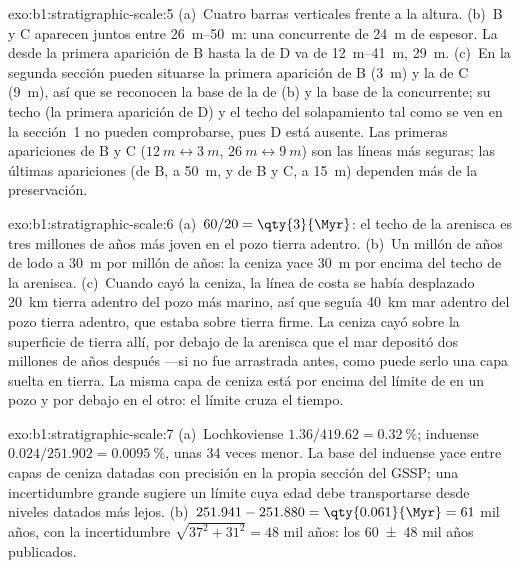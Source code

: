 \begin{solution}{exo:b1:stratigraphic-scale:5}
(a)~Cuatro barras verticales frente a la altura. (b)~B y C aparecen juntos entre \qtyrange{26}{50}{m}: una  concurrente de \qty{24}{m} de espesor. La 
desde la primera aparición de B hasta la de D va de \qtyrange{12}{41}{m}, \qty{29}{m}. (c)~En la segunda sección pueden situarse la primera aparición de B (\qty{3}{m}) y la de C (\qty{9}{m}), así que se reconocen la base de la  de (b) y
la base de la  concurrente; su techo (la primera aparición de D) y el techo del solapamiento tal como se ven en la sección~1 no pueden comprobarse, pues D está ausente. Las primeras apariciones de B y C ($\qty{12}{m} \leftrightarrow
\qty{3}{m}$, $\qty{26}{m} \leftrightarrow \qty{9}{m}$) son las líneas más seguras; las últimas apariciones (de B, a \qty{50}{m}, y de B y C, a \qty{15}{m}) dependen más de la preservación.
\end{solution}

\begin{solution}{exo:b1:stratigraphic-scale:6}
(a)~$60/20 = \qty{3}{\Myr}$: el techo de la arenisca es tres millones de años más joven en el pozo tierra adentro. (b)~Un millón de años de lodo a \qty{30}{m} por millón de años: la ceniza yace
\qty{30}{m} por encima del techo de la arenisca. (c)~Cuando cayó la ceniza, la línea de costa se había desplazado \qty{20}{km} tierra adentro del pozo más marino, así que seguía \qty{40}{km} mar adentro del pozo tierra adentro, que estaba sobre tierra firme. La ceniza cayó sobre la superficie de tierra allí, por debajo de la arenisca que el mar depositó dos millones de años después ---si no fue arrastrada antes, como puede serlo una capa suelta en tierra. La misma capa de ceniza está por encima del límite de  en un pozo y por debajo en el otro: el límite cruza el tiempo.
\end{solution}

\begin{solution}{exo:b1:stratigraphic-scale:7}
(a)~Lochkoviense $1.36/419.62 = \qty{0.32}{\%}$; induense $0.024/251.902 =
\qty{0.0095}{\%}$, unas 34 veces menor. La base del induense yace entre capas de ceniza datadas con precisión en la propia sección del GSSP; una incertidumbre grande sugiere un límite cuya edad debe transportarse desde niveles datados más lejos.
(b)~$251.941 - 251.880 = \qty{0.061}{\Myr} = 61$ mil años, con la incertidumbre $\sqrt{37^2 + 31^2} = 48$ mil años: los
\num[uncertainty-mode=separate]{60 \pm 48} mil años publicados.
\end{solution}

